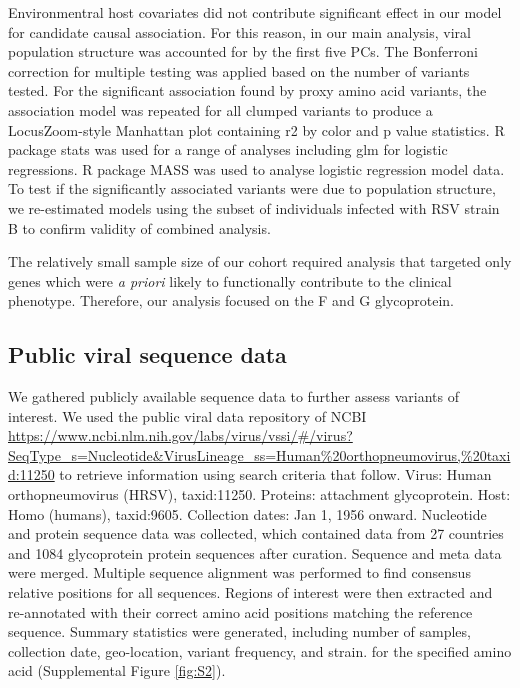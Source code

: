 \documentclass{article} %
\begin{document}
Environmentral host covariates did not contribute significant effect in our model for candidate causal association. For this reason, in our main analysis, viral population structure was accounted for by the first five PCs. The Bonferroni correction for multiple testing was applied based on the number of variants tested. For the significant association found by proxy amino acid variants, the association model was repeated for all clumped variants to produce a LocusZoom-style Manhattan plot containing r2 by color and p value statistics. R package stats was used for a range of analyses including glm for logistic regressions. R package MASS was used to analyse logistic regression model data. To test if the significantly associated variants were due to population structure, we re-estimated models using the subset of individuals infected with RSV strain B to confirm validity of combined analysis.

The relatively small sample size of our cohort required analysis that targeted only genes which were \textit{a priori} likely to functionally contribute to the clinical phenotype. Therefore, our analysis focused on the F and G glycoprotein.

\subsection{Public viral sequence data}
We gathered publicly available sequence data to further assess variants of interest. We used the public viral data repository of NCBI  \url{https://www.ncbi.nlm.nih.gov/labs/virus/vssi/#/virus?SeqType_s=Nucleotide&VirusLineage_ss=Human\%20orthopneumovirus,\%20taxid:11250}
to retrieve information using search criteria that follow. Virus: Human orthopneumovirus (HRSV), taxid:11250. Proteins: attachment glycoprotein. Host: Homo (humans), taxid:9605. Collection dates: Jan 1, 1956 onward. Nucleotide and protein sequence data was collected, which contained data from 27 countries and 1084 glycoprotein protein sequences after curation. Sequence and meta data were merged. Multiple sequence alignment was performed to find consensus relative positions for all sequences. Regions of interest were then extracted and re-annotated with their correct amino acid positions matching the reference sequence. Summary statistics were generated, including number of samples, collection date, geo-location, variant frequency, and strain. for the specified amino acid 
(Supplemental Figure \ref{fig:S2}).
\end{document}
